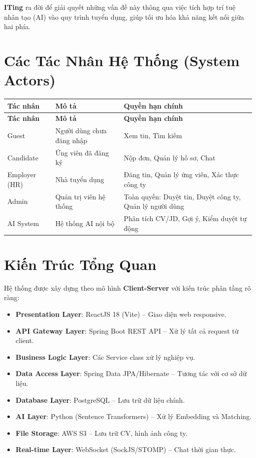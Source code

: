 \documentclass[12pt, a4paper]{report}
\begin{document}
\textbf{ITing} ra đời để giải quyết những vấn đề này thông qua việc tích hợp trí tuệ nhân tạo (AI) vào quy trình tuyển dụng, giúp tối ưu hóa khả năng kết nối giữa hai phía.

\section{Các Tác Nhân Hệ Thống (System Actors)}

\begin{longtable}{|p{3cm}|p{5cm}|p{6cm}|}
\hline
\textbf{Tác nhân} & \textbf{Mô tả} & \textbf{Quyền hạn chính} \\
\hline
\endfirsthead
\hline
\textbf{Tác nhân} & \textbf{Mô tả} & \textbf{Quyền hạn chính} \\
\hline
\endhead
Guest & Người dùng chưa đăng nhập & Xem tin, Tìm kiếm \\
\hline
Candidate & Ứng viên đã đăng ký & Nộp đơn, Quản lý hồ sơ, Chat \\
\hline
Employer (HR) & Nhà tuyển dụng & Đăng tin, Quản lý ứng viên, Xác thực công ty \\
\hline
Admin & Quản trị viên hệ thống & Toàn quyền: Duyệt tin, Duyệt công ty, Quản lý người dùng \\
\hline
AI System & Hệ thống AI nội bộ & Phân tích CV/JD, Gợi ý, Kiểm duyệt tự động \\
\hline
\end{longtable}

\section{Kiến Trúc Tổng Quan}

Hệ thống được xây dựng theo mô hình \textbf{Client-Server} với kiến trúc phân tầng rõ ràng:

\begin{itemize}
    \item \textbf{Presentation Layer}: ReactJS 18 (Vite) -- Giao diện web responsive.
    \item \textbf{API Gateway Layer}: Spring Boot REST API -- Xử lý tất cả request từ client.
    \item \textbf{Business Logic Layer}: Các Service class xử lý nghiệp vụ.
    \item \textbf{Data Access Layer}: Spring Data JPA/Hibernate -- Tương tác với cơ sở dữ liệu.
    \item \textbf{Database Layer}: PostgreSQL -- Lưu trữ dữ liệu chính.
    \item \textbf{AI Layer}: Python (Sentence Transformers) -- Xử lý Embedding và Matching.
    \item \textbf{File Storage}: AWS S3 -- Lưu trữ CV, hình ảnh công ty.
    \item \textbf{Real-time Layer}: WebSocket (SockJS/STOMP) -- Chat thời gian thực.
\end{itemize}
\end{document}
